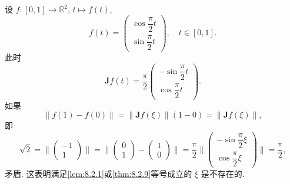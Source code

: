 \begin{example}\label{ex:8.2.2}
设 $f: [0, 1] \to \mathbb{R}^{2}$, $t \mapsto f(t)$,
\[
  f(t) = \begin{pmatrix} \cos\dfrac{\pi}{2}t \\[2mm] \sin\dfrac{\pi}{2}t \end{pmatrix}, \quad t \in [0, 1].
\]
此时
\[
  \boldsymbol{J}f(t) = \frac{\pi}{2}\begin{pmatrix} -\sin\dfrac{\pi}{2}t \\[2mm] \cos\dfrac{\pi}{2}t \end{pmatrix}.
\]
如果
\[
  \|f(1) - f(0)\| = \|\boldsymbol{J}f(\xi)\|(1 - 0) = \|\boldsymbol{J}f(\xi)\|,
\]
即
\[
  \sqrt{2} = \Big\|\begin{pmatrix} -1 \\ 1 \end{pmatrix}\Big\| = \Big\|\begin{pmatrix} 0 \\ 1 \end{pmatrix} - \begin{pmatrix} 1 \\ 0 \end{pmatrix}\Big\| = \frac{\pi}{2}\Big\|\begin{pmatrix} -\sin\dfrac{\pi}{2}\xi \\[2mm] \cos\dfrac{\pi}{2}\xi \end{pmatrix}\Big\| = \frac{\pi}{2},
\]
矛盾. 这表明满足\cref{lem:8.2.1}或\cref{thm:8.2.9}等号成立的 $\xi$ 是不存在的. \qedhere
\end{example}

